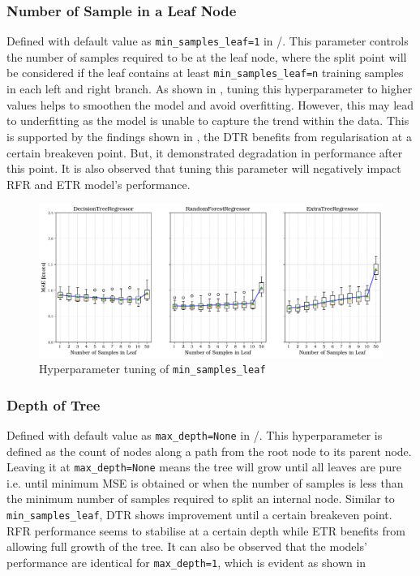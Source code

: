 \subsubsection*{Number of Sample in a Leaf Node}\label{sec:min_samples_leaf}

Defined with default value as {\tt min\_samples\_leaf=1} in \scikit/. This parameter controls the number of samples required to be at the leaf node, where the split point will be considered if the leaf contains at least {\tt min\_samples\_leaf=n} training samples in each left and right branch. As shown in , tuning this hyperparameter to higher values helps to smoothen the model and avoid overfitting. However, this may lead to underfitting as the model is unable to capture the trend within the data. This is supported by the findings shown in , the DTR benefits from regularisation at a certain breakeven point. But, it demonstrated degradation in performance after this point. It is also observed that tuning this parameter will negatively impact RFR and ETR model's performance. 

\begin{figure}[h]
    \centering
        \includegraphics[width=.85\textwidth]{02_figures/hpo_min_samples_leaf_mae.png}
        \caption{Hyperparameter tuning of {\tt min\_samples\_leaf}}
        \label{fig:hpo_min_samples_leaf}
\end{figure}

\subsubsection*{Depth of Tree}\label{sec:max_depth}

Defined with default value as {\tt max\_depth=None} in \scikit/. This hyperparameter is defined as the count of nodes along a path from the root node to its parent node. Leaving it at {\tt max\_depth=None} means the tree will grow until all leaves are pure i.e. until minimum MSE is obtained or when the number of samples is less than the minimum number of samples required to split an internal node. Similar to {\tt min\_samples\_leaf}, DTR shows improvement until a certain breakeven point. RFR performance seems to stabilise at a certain depth while ETR benefits from allowing full growth of the tree. It can also be observed that the models' performance are identical for {\tt max\_depth=1}, which is evident as shown in   

